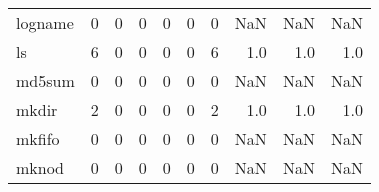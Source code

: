\begin{tabular}{lrrrrrrrrr}
logname   &                                       0 &                                                  0 &                                                  0 &                                                  0 &                                                  0 &                                                  0 &                                                NaN &                                    NaN &                                  NaN \\
ls        &                                       6 &                                                  0 &                                                  0 &                                                  0 &                                                  0 &                                                  6 &                                                1.0 &                                    1.0 &                                  1.0 \\
md5sum    &                                       0 &                                                  0 &                                                  0 &                                                  0 &                                                  0 &                                                  0 &                                                NaN &                                    NaN &                                  NaN \\
mkdir     &                                       2 &                                                  0 &                                                  0 &                                                  0 &                                                  0 &                                                  2 &                                                1.0 &                                    1.0 &                                  1.0 \\
mkfifo    &                                       0 &                                                  0 &                                                  0 &                                                  0 &                                                  0 &                                                  0 &                                                NaN &                                    NaN &                                  NaN \\
mknod     &                                       0 &                                                  0 &                                                  0 &                                                  0 &                                                  0 &                                                  0 &                                                NaN &                                    NaN &                                  NaN \\

\end{tabular}
